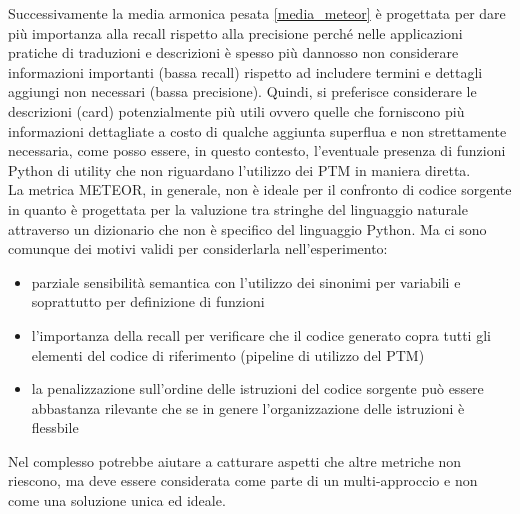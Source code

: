 \documentclass{article}
\begin{document}
\begin{itemize}
    Successivamente la media armonica pesata \ref{media_meteor} è progettata per dare più importanza alla recall rispetto alla precisione perché nelle applicazioni pratiche di traduzioni e descrizioni è spesso più dannosso non considerare informazioni importanti (bassa recall) rispetto ad includere termini e dettagli aggiungi non necessari (bassa precisione). Quindi, si preferisce considerare le descrizioni (card) potenzialmente più utili ovvero quelle che forniscono più informazioni dettagliate a costo di qualche aggiunta superflua e non strettamente necessaria, come posso essere, in questo contesto, l'eventuale presenza di funzioni Python di utility che non riguardano l'utilizzo dei PTM in maniera diretta.\\
    La metrica METEOR, in generale, non è ideale per il confronto di codice sorgente in quanto è progettata per la valuzione tra stringhe del linguaggio naturale attraverso un dizionario che non è specifico del linguaggio Python. Ma ci sono comunque dei motivi validi per considerlarla nell'esperimento:
    \begin{itemize}
        \item parziale sensibilità semantica con l'utilizzo dei sinonimi per variabili e soprattutto per definizione di funzioni
        \item l'importanza della recall per verificare che il codice generato copra tutti gli elementi del codice di riferimento (pipeline di utilizzo del PTM)
        \item la penalizzazione sull'ordine delle istruzioni del codice sorgente può essere abbastanza rilevante che se in genere l'organizzazione delle istruzioni è flessbile
    \end{itemize}
    Nel complesso potrebbe aiutare a catturare aspetti che altre metriche non riescono, ma deve essere considerata come parte di un multi-approccio e non come una soluzione unica ed ideale.
    

\end{itemize}
\end{document}
